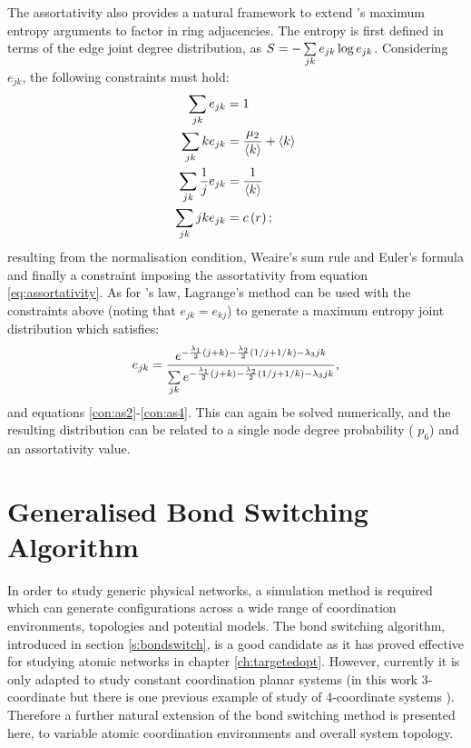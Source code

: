 The assortativity also provides a natural framework to extend \lm's maximum entropy arguments to factor in ring adjacencies.
The entropy is first defined in terms of the edge joint degree distribution, as $S=-\sum\limits_{jk} e_{jk}\log e_{jk}$.
Considering $e_{jk}$, the following constraints must hold:
\begin{align}
        \sum\limits_{jk} e_{jk} &=1 \label{con:as1}\\
        \sum\limits_{jk} ke_{jk} &= \frac{\mu_2}{\langle k \rangle}+\langle k \rangle \label{con:as2}\\
        \sum\limits_{jk} \frac{1}{j}e_{jk} &= \frac{1}{\langle k \rangle} \label{con:as3}\\
        \sum\limits_{jk} jke_{jk} &= c\left(r\right)\label{con:as4};
\end{align}
resulting from the normalisation condition, Weaire's sum rule \cite{Weaire1974} and Euler's formula and finally a constraint imposing the assortativity from equation \eqref{eq:assortativity}.
As for \lm's law, Lagrange's method can be used with the constraints above (noting that $e_{jk}=e_{kj}$) to generate a maximum entropy joint distribution which satisfies:
\begin{equation}
        \label{eq:mer}
        e_{jk} = \frac{e^{-\frac{\lambda_1}{2}\left(j+k\right)-\frac{\lambda_2}{2}\left(1/j+1/k\right)-\lambda_3 jk}}{\sum\limits_{jk} e^{-\frac{\lambda_1}{2}\left(j+k\right)-\frac{\lambda_2}{2}\left(1/j+1/k\right)-\lambda_3 jk}},
\end{equation}
and equations \eqref{con:as2}\--\eqref{con:as4}.
This can again be solved numerically, and the resulting distribution can be related to a single node degree probability (\eg{} $p_6$) and an assortativity value.

\section{Generalised Bond Switching Algorithm}
\label{s:genbondswitching}

In order to study generic physical networks, a simulation method is required which can generate configurations across a wide range of coordination environments, topologies and potential models. 
The bond switching algorithm, introduced in section \ref{s:bondswitch}, is a good candidate as it has proved effective for studying atomic networks in chapter \ref{ch:targetedopt}.
However, currently it is only adapted to study constant coordination planar systems (in this work 3\--coordinate but there is one previous example of study of 4\--coordinate systems \cite{Greneche1990}).
Therefore a further natural extension of the bond switching method is presented here, to variable atomic coordination environments and overall system topology.

